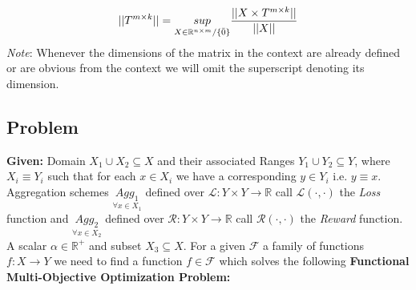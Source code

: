 \begin{equation}
   ||T^{m\times k}|| = \underset{X \in \mathbb{R}^{n\times m}/\{\Bar{0}\}}{sup} \frac{||X\times T^{m\times k}||}{||X||}
\end{equation}
\textit{Note}: Whenever the dimensions of the matrix in the context are already defined or are obvious from the context we will omit the superscript denoting its dimension.
\subsection{Problem} \label{prob_def}

\textbf{Given:}\newline
Domain $X_1\cup X_2 \subseteq X$ and their associated Ranges $Y_1\cup Y_2 \subseteq Y$, where $X_i\equiv Y_i$ such that for each $x \in X_i$ we have a corresponding $y \in Y_i$ i.e. $y\equiv x$.\newline
Aggregation schemes $\underset{\forall x\in X_1}{Agg_1}$ defined over $\mathcal{L}: Y \times Y \to \mathbb{R}$ call $\mathcal{L}(\cdot,\cdot)$ the \textit{Loss} function and $\underset{\forall x\in X_2}{Agg_2}$ defined over $\mathcal{R}: Y \times Y \to \mathbb{R}$ call $\mathcal{R}(\cdot,\cdot)$  the \textit{Reward} function.\newline
A scalar $\alpha \in \mathbb{R^+}$ and subset $X_3 \subseteq X$.\newline
For a given $\mathcal{F}$ a family of functions $f: X \to Y$ we need to find a function $f \in \mathcal{F}$ which solves the following \newline\newline \textbf{Functional Multi-Objective Optimization Problem:}

